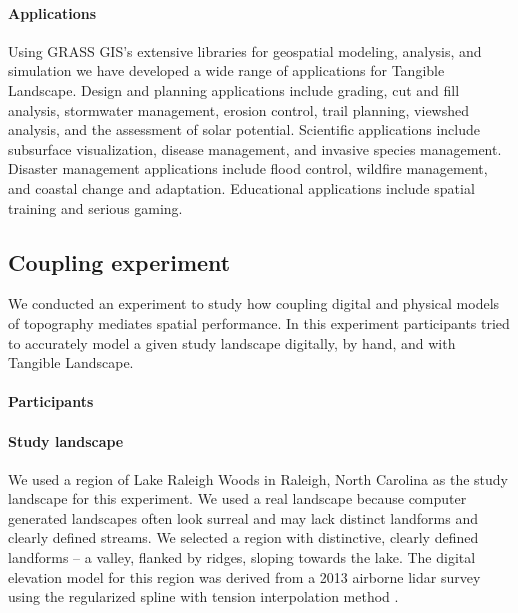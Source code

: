 \documentclass[prodmode,acmtochi]{acmsmall} %
\begin{document}
\paragraph{Applications}
Using GRASS GIS's extensive libraries for geospatial modeling, analysis, and simulation 
we have developed a wide range of applications for Tangible Landscape.
%
Design and planning applications include
grading, cut and fill analysis, stormwater management, erosion control, 
trail planning, viewshed analysis, and the assessment of solar potential. 
%
Scientific applications include
subsurface visualization, disease management, and invasive species management.
%
Disaster management applications include 
flood control, wildfire management, and coastal change and adaptation. 
%
Educational applications include
spatial training and serious gaming.



\subsection{Coupling experiment}
We conducted an experiment to study how coupling digital and physical models of topography mediates spatial performance. 
%
%
In this experiment %
participants tried to accurately model a given study landscape 
digitally, by hand, and with Tangible Landscape. 

\paragraph{Participants}

\paragraph{Study landscape}
We used a region of Lake Raleigh Woods in Raleigh, North Carolina 
as the study landscape for this experiment. 
%
We used a real landscape because computer generated landscapes 
often look surreal and may lack distinct landforms and clearly defined streams. 
%
We selected a region with distinctive, 
clearly defined landforms -- a valley, flanked by ridges, sloping towards the lake.
%
The digital elevation model for this region was derived from a 2013 airborne lidar survey using the regularized spline with tension interpolation method \cite{Mitasova2005}. 
\end{document}
